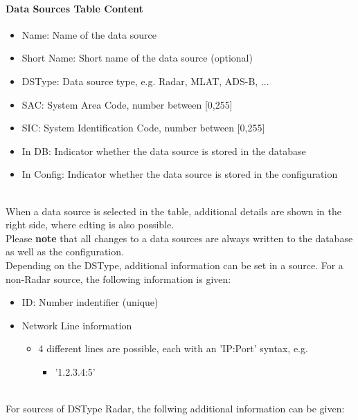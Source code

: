 \paragraph {Data Sources Table Content}
\label{sec:configure_datasources_table_content}

\begin{itemize}
\item Name: Name of the data source
\item Short Name: Short name of the data source (optional)
\item DSType: Data source type, e.g. Radar, MLAT, ADS-B, ...
\item SAC: System Area Code, number between [0,255]
\item SIC: System Identification Code, number between [0,255]
\item In DB: Indicator whether the data source is stored in the database
\item In Config: Indicator whether the data source is stored in the configuration
\end{itemize}
\ \\

When a data source is selected in the table, additional details are shown in the right side, where edting is also possible. \\

Please \textbf{note} that all changes to a data sources are always written to the database as well as the configuration. \\

Depending on the DSType, additional information can be set in a source. For a non-Radar source, the following information is given:

\begin{itemize}
\item ID: Number indentifier (unique)
\item Network Line information
\begin{itemize}
    \item 4 different lines are possible, each with an 'IP:Port' syntax, e.g.
    \begin{itemize}
    \item '1.2.3.4:5'
\end{itemize}
\end{itemize}
\end{itemize}
\ \\

For sources of DSType Radar, the follwing additional information can be given:

